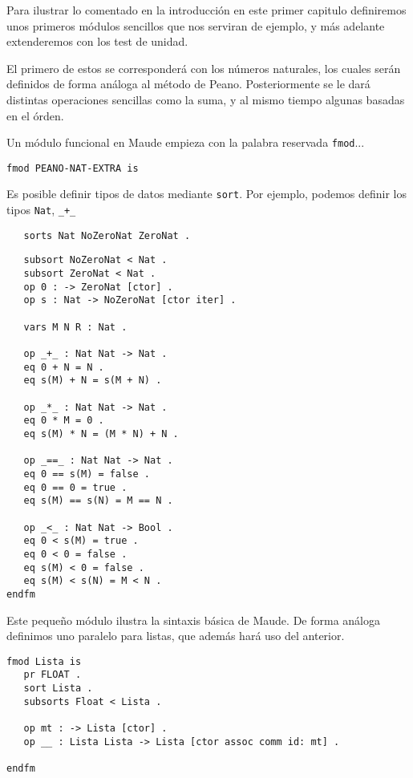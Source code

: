 
Para ilustrar lo comentado en la introducción en este primer capitulo definiremos unos primeros m\'odulos sencillos que nos serviran de ejemplo, y m\'as adelante extenderemos con los test de unidad. \par
El primero de estos se corresponder\'a con los números naturales, los cuales ser\'an definidos de forma an\'aloga al m\'etodo de Peano. Posteriormente se le dar\'a distintas operaciones sencillas como la suma, y al mismo tiempo algunas basadas en el \'orden.\par

Un módulo funcional en Maude empieza con la palabra reservada \texttt{fmod}...

{\codesize
\begin{verbatim}
fmod PEANO-NAT-EXTRA is
\end{verbatim}
}

Es posible definir tipos de datos mediante \texttt{sort}. Por ejemplo, podemos definir
los tipos \texttt{Nat}, \verb"_+_"


{\codesize
\begin{verbatim}
   sorts Nat NoZeroNat ZeroNat .
\end{verbatim}
}

{\codesize
\begin{verbatim}
   subsort NoZeroNat < Nat .
   subsort ZeroNat < Nat .
   op 0 : -> ZeroNat [ctor] .
   op s : Nat -> NoZeroNat [ctor iter] .

   vars M N R : Nat .

   op _+_ : Nat Nat -> Nat .
   eq 0 + N = N .
   eq s(M) + N = s(M + N) .

   op _*_ : Nat Nat -> Nat .
   eq 0 * M = 0 .
   eq s(M) * N = (M * N) + N .
	
   op _==_ : Nat Nat -> Nat .
   eq 0 == s(M) = false .
   eq 0 == 0 = true .
   eq s(M) == s(N) = M == N .
	
   op _<_ : Nat Nat -> Bool .
   eq 0 < s(M) = true .
   eq 0 < 0 = false .
   eq s(M) < 0 = false .
   eq s(M) < s(N) = M < N .
endfm
\end{verbatim}
}

Este pequeño m\'odulo ilustra la sintaxis b\'asica de Maude. De forma an\'aloga definimos uno paralelo para listas, que adem\'as har\'a uso del anterior. 

\begin{verbatim}
fmod Lista is
   pr FLOAT .
   sort Lista .
   subsorts Float < Lista .
	
   op mt : -> Lista [ctor] .
   op __ : Lista Lista -> Lista [ctor assoc comm id: mt] .

endfm
\end{verbatim}

